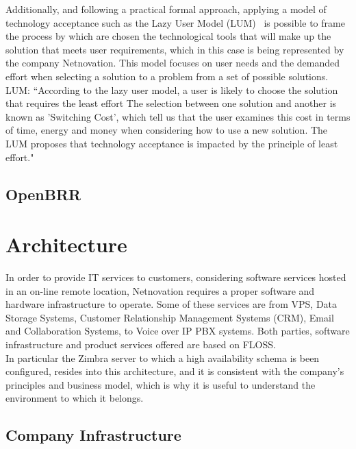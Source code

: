 \documentclass[a4paper, 12pt]{book}
\begin{document}
\noindent Additionally, and following a practical formal approach, applying a model of technology acceptance such as the Lazy User Model (LUM)~\cite{Collan and Tetard} is possible to frame the process by which are chosen the technological tools that will make up the solution that meets user requirements, which in this case is being represented by the company Netnovation. This model focuses on user needs and the demanded effort when selecting a solution to a problem from a set of possible solutions.\\

LUM: ``According to the lazy user model, a user is likely to choose the solution that requires the least effort
The selection between one solution and another is known as 'Switching Cost', which tell us that the user examines this cost in terms of time, energy and money when considering how to use a new solution. The LUM proposes that technology acceptance is impacted by the principle of least effort."

\section{OpenBRR}
\label{sec:openbrr}


%
\chapter{Architecture}
\label{chap:architecture}

In order to provide IT services to customers, considering software services hosted in an on-line remote location, Netnovation requires a proper software and hardware infrastructure to operate. Some of these services are from VPS, Data Storage Systems, Customer Relationship Management Systems (CRM), Email and Collaboration Systems, to Voice over IP PBX systems. Both parties, software infrastructure and product services offered are based on FLOSS.\\

\noindent In particular the Zimbra server to which a high availability schema is been configured, resides into this architecture, and it is consistent with the company's principles and business model, which is why it is useful to understand the environment to which it belongs.


\section{Company Infrastructure}
\label{sec:infrastructure}
\end{document}
